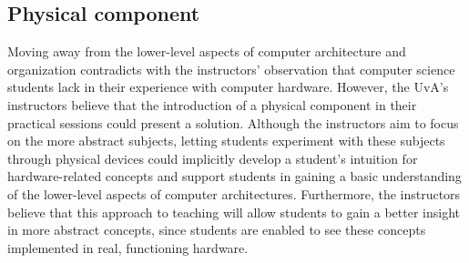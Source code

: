 \documentclass[main.tex]{subfiles}
\begin{document}
\subsection{Physical component}

Moving away from the lower-level aspects of computer architecture and organization contradicts with the instructors' observation that computer science students lack in their experience with computer hardware. However, the UvA's instructors believe that the introduction of a physical component in their practical sessions could present a solution. Although the instructors aim to focus on the more abstract subjects, letting students experiment with these subjects through physical devices could implicitly develop a student's intuition for hardware-related concepts and support students in gaining a basic understanding of the lower-level aspects of computer architectures. Furthermore, the instructors believe that this approach to teaching will allow students to gain a better insight in more abstract concepts, since students are enabled to see these concepts  implemented in real, functioning hardware.
\end{document}
